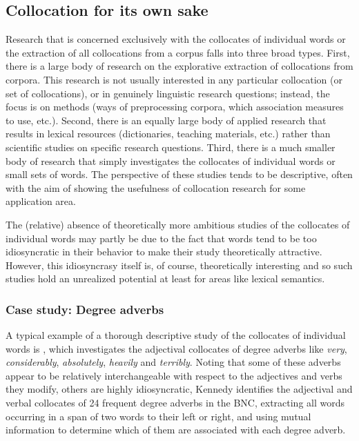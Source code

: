 \subsection{Collocation for its own sake}
\label{sec:collocationforitsownsake}

Research that is concerned exclusively with the collocates  of individual words or the extraction  of all collocations from a corpus falls into three broad types. First, there is a large body of research on the explorative  extraction of collocations from corpora. This research is not usually interested in any particular collocation (or set of collocations),  or in genuinely linguistic research questions; instead, the focus is on methods (ways of preprocessing corpora, which association  measures  to use, etc.). Second, there is an equally large body of applied research that results in lexical resources (dictionaries,  teaching materials, etc.) rather than scientific studies on specific research questions. Third, there is a much smaller body of research that simply investigates the collocates  of individual words or small sets of words. The perspective of these studies tends to be descriptive,  often with the aim of showing the usefulness of collocation research for some application area.

The (relative) absence of theoretically more ambitious studies of the collocates  of individual words may partly be due to the fact that words tend to be too idiosyncratic in their behavior to make their study theoretically attractive. However, this idiosyncrasy itself is, of course, theoretically interesting and so such studies hold an unrealized potential at least for areas like lexical  semantics.

\subsubsection{Case study: Degree adverbs}
\label{sec:degreeadverbs}

A typical example of a thorough descriptive  study of the collocates  of individual words is \citet{kennedy_amplifier_2003}, which investigates the adjectival  collocates of degree adverbs  like \textit{very}, \textit{considerably}, \textit{absolutely}, \textit{heavily} and \textit{terribly}. Noting that some of these adverbs  appear to be relatively interchangeable with respect to the adjectives  and verbs  they modify, others are highly idiosyncratic, Kennedy identifies the adjectival  and verbal collocates  of 24 frequent degree adverbs in the BNC,  extracting  all words occurring in a span  of two words to their left or right, and using mutual information  to determine which of them are associated  with each degree   adverb.

